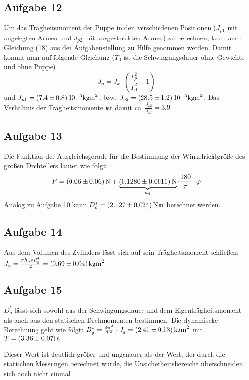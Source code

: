 \documentclass[a4paper,11pt,ngerman]{scrartcl}
\begin{document}
\subsection{Aufgabe 12}\label{sub:A12}
Um das Trägheitsmoment der Puppe in den verschiedenen Positionen ($J_{p1}$ mit angelegten Armen und $J_{p2}$ mit ausgestreckten Armen) zu berechnen, kann auch Gleichung (18) aus der Aufgabenstellung zu Hilfe genommen werden. Damit kommt man auf folgende Gleichung ($T_0$ ist die Schwingungsdauer ohne Gewichte und ohne Puppe)
\begin{equation}\label{equ:TraegheitsmomentPuppe}
J_p = J_k \cdot \left(\frac{T_p^2}{T_0^2} - 1\right)
\end{equation}
und $J_{p1} = \SI{7.4 \pm 0.8}{10^{-5}kgm^2}$, bzw. $J_{p2} = \SI{28.5 \pm 1.2}{10^{-5}kgm^2}$. Das Verhältnis der Trägheitsmomente ist damit ca. $\frac{J_{p2}}{J_{p1}} = 3.9$

\subsection{Aufgabe 13}

Die Funktion der Ausgleichsgerade für die Bestimmung der Winkelrichtgröße des großen Drehtellers lautet wie folgt:
\begin{equation}
F = \SI{0.06 \pm 0.06}{N} + \underbrace{\SI{0.1280 \pm 0.0011}{N}}_{a_4} \cdot \frac{180}{\pi} \cdot \varphi
\end{equation}
Analog zu Aufgabe 10 kann $D^*_g = \SI{2.127 \pm 0.024}{Nm}$ berechnet werden.

\subsection{Aufgabe 14}
Aus dem Volumen des Zylinders lässt sich auf sein Trägheitsmoment schließen: $J_g = \frac{\pi h_g \rho R_g^4}{2} = \SI{0.69 \pm 0.04}{kgm^2}$

\subsection{Aufgabe 15}
$D^*_g$ lässt sich sowohl aus der Schwingungsdauer und dem Eigenträgheitsmoment als auch aus den statischen Drehmomenten bestimmen. Die dynamische Berechnung geht wie folgt: $D^*_g = \frac{4\pi^2}{T^2} \cdot J_g = \SI{2.41 \pm 0.13}{kgm^2}$ mit $T = \SI{3.36 \pm 0.07}{s}$

Dieser Wert ist deutlich größer und ungenauer als der Wert, der durch die statischen Messungen berechnet wurde, die Unsicherheitsbereiche überschneiden sich noch nicht einmal.
\end{document}
